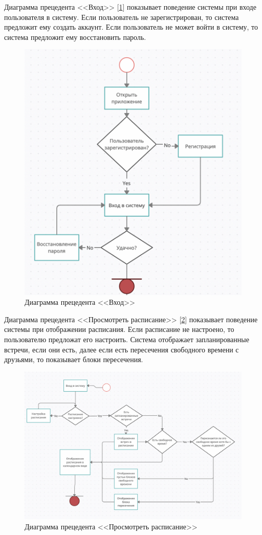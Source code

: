 \documentclass[14pt]{extreport}
\begin{document}
Диаграмма прецедента <<Вход>> [\ref{fig:d2}] показывает поведение системы при входе пользователя в систему. Если пользователь не зарегистрирован, то система предложит ему создать аккаунт. Если пользователь не может войти в систему, то система предложит ему восстановить пароль.
\begin{figure}[h]   
    \centering
    \includegraphics[width=0.94\linewidth]{img/d2.png}
    \caption{ Диаграмма прецедента <<Вход>>}
    \label{fig:d2}
\end{figure}
\newpage 
Диаграмма прецедента <<Просмотреть расписание>> [\ref{fig:d3}] показывает поведение системы при отображении расписания. Если расписание не настроено, то пользователю предложат его настроить. Система отображает запланированные встречи, если они есть, далее если есть пересечения свободного времени с друзьями, то показывает блоки пересечения. 
\begin{figure}[h]   
    \centering
    \includegraphics[width=0.94\linewidth]{img/d3.png}
    \caption{ Диаграмма прецедента <<Просмотреть расписание>>}
    \label{fig:d3}
\end{figure}
\end{document}
